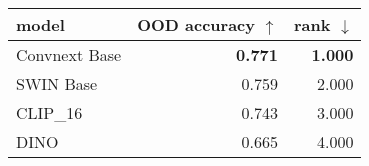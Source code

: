 \begin{tabular}{lrr}
\toprule
        model & OOD accuracy $\uparrow$ & rank $\downarrow$ \\
\midrule
Convnext Base &          \textbf{0.771} &    \textbf{1.000} \\
    SWIN Base &                   0.759 &             2.000 \\
     CLIP\_16 &                   0.743 &             3.000 \\
         DINO &                   0.665 &             4.000 \\
\bottomrule
\end{tabular}

